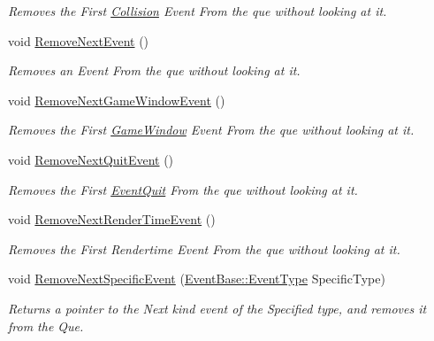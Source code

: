 \begin{DoxyCompactItemize}
\begin{DoxyCompactList}\small\item\em Removes the First \hyperlink{classMezzanine_1_1Collision}{Collision} Event From the que without looking at it. \item\end{DoxyCompactList}\item 
void \hyperlink{classMezzanine_1_1EventManager_a0694b97c1b9696f5b28d0baf7a2f7c40}{RemoveNextEvent} ()
\begin{DoxyCompactList}\small\item\em Removes an Event From the que without looking at it. \item\end{DoxyCompactList}\item 
void \hyperlink{classMezzanine_1_1EventManager_a6108fd63aed85b5a3f38987f75603c53}{RemoveNextGameWindowEvent} ()
\begin{DoxyCompactList}\small\item\em Removes the First \hyperlink{classMezzanine_1_1GameWindow}{GameWindow} Event From the que without looking at it. \item\end{DoxyCompactList}\item 
void \hyperlink{classMezzanine_1_1EventManager_a10735469d564d6731c3741acf265879c}{RemoveNextQuitEvent} ()
\begin{DoxyCompactList}\small\item\em Removes the First \hyperlink{classMezzanine_1_1EventQuit}{EventQuit} From the que without looking at it. \item\end{DoxyCompactList}\item 
void \hyperlink{classMezzanine_1_1EventManager_a9a0b6340a0b0a6a96b7918f758f44c31}{RemoveNextRenderTimeEvent} ()
\begin{DoxyCompactList}\small\item\em Removes the First Rendertime Event From the que without looking at it. \item\end{DoxyCompactList}\item 
void \hyperlink{classMezzanine_1_1EventManager_a8fe12f47a64f3af8dcb30f13ee60e303}{RemoveNextSpecificEvent} (\hyperlink{classMezzanine_1_1EventBase_ab85e31e97753b7e7ecb098f82526baef}{EventBase::EventType} SpecificType)
\begin{DoxyCompactList}\small\item\em Returns a pointer to the Next kind event of the Specified type, and removes it from the Que. \item\end{DoxyCompactList}\item 

\end{DoxyCompactItemize}
